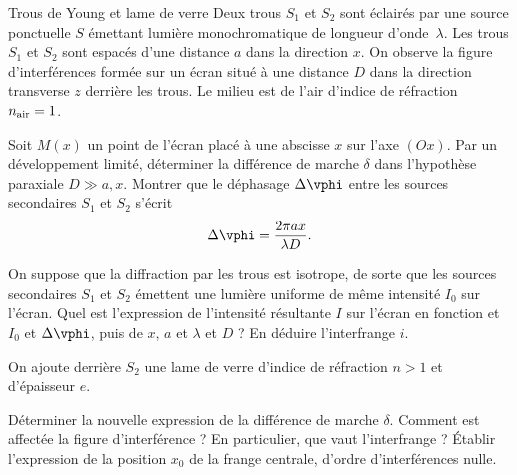 \begin{exo}[PC][1][colle]{Trous de Young et lame de verre}
Deux trous $S_1$ et $S_2$ sont éclairés par une source ponctuelle $S$ émettant lumière monochromatique de longueur d'onde~$\lambda$. Les trous $S_1$ et $S_2$ sont espacés d'une distance $a$ dans la direction $x$. On observe la figure d'interférences formée sur un écran situé à une distance $D$ dans la direction transverse $z$ derrière les trous. Le milieu est de l'air d'indice de réfraction~$n_{\rm air}=1$.

\begin{quest}
  \item	 Soit $M(x)$ un point de l'écran placé à une abscisse $x$ sur l’axe $(Ox)$. Par un développement limité, déterminer la différence de marche $\delta$ dans l'hypothèse paraxiale $D\gg a,x$. Montrer que le déphasage $\Delta \vphi$ entre les sources secondaires $S_1$ et $S_2$ s'écrit 
  \begin{equation}
    \Delta \vphi = \frac{2\pi a x}{\lambda D}.
  \end{equation}

  
  
  \item On suppose que la diffraction par les trous est isotrope, de sorte que les sources secondaires $S_1$ et $S_2$ émettent une lumière uniforme de même intensité $I_0$ sur l'écran. Quel est l'expression de l'intensité résultante $I$ sur l'écran en fonction et $I_0$ et $\Delta \vphi$, puis de $x$, $a$ et $\lambda$ et $D$ ? En déduire l'interfrange $i$.
  
\end{quest}
On ajoute derrière $S_2$ une lame de verre d'indice de réfraction $n >1$ et d'épaisseur $e$.
  \begin{quest}
  \item Déterminer la nouvelle expression de la différence de marche $\delta$. Comment est affectée la figure d'interférence ? En particulier, que vaut l'interfrange ? Établir l'expression de la position $x_0$ de la frange centrale, d'ordre d'interférences nulle.
  
  

\end{quest}
\end{exo}
